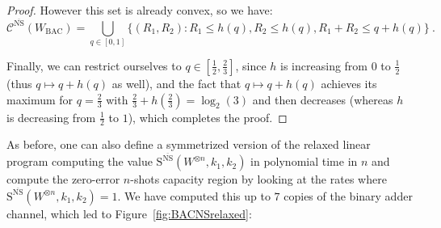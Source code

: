 \begin{proof}
    However this set is already convex, so we have:
    \[\mathcal{C}^{\overline{\mathrm{NS}}}(W_{\text{BAC}}) = \bigcup_{q \in [0,1]}\{ (R_1,R_2) : R_1 \leq h\left(q\right), R_2 \leq h\left(q\right), R_1+R_2 \leq q+h\left(q\right)\} \ .\]
    
    Finally, we can restrict ourselves to $q \in \left[\frac{1}{2},\frac{2}{3}\right]$, since $h$ is increasing from $0$ to $\frac{1}{2}$ (thus $q \mapsto q+h\left(q\right)$ as well), and the fact that $q \mapsto q+h\left(q\right)$ achieves its maximum for $q=\frac{2}{3}$ with $\frac{2}{3}+h\left(\frac{2}{3}\right)=\log_2(3)$ and then decreases (whereas $h$ is decreasing from $\frac{1}{2}$ to $1$), which completes the proof.
  \end{proof}

  As before, one can also define a symmetrized version of the relaxed linear program computing the value $\mathrm{S}^{\overline{\mathrm{NS}}}(W^{\otimes n},k_1,k_2)$ in polynomial time in $n$ and compute the zero-error $n$-shots capacity region by looking at the rates where $\mathrm{S}^{\overline{\mathrm{NS}}}(W^{\otimes n},k_1,k_2)=1$. We have computed this up to $7$ copies of the binary adder channel, which led to Figure~\ref{fig:BACNSrelaxed}:
\shorthandoff{;} 
